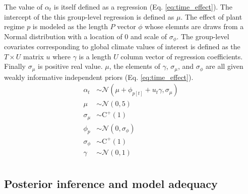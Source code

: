 \documentclass[12pt,letterpaper]{article}
\begin{document}
The value of \(\alpha_{t}\) is itself defined as a regression (Eq. \ref{eq:time_effect}). The intercept of the this group-level regression is defined as \(\mu\). The effect of plant regime \(p\) is modeled as the length \(P\) vector \(\phi\) whose elemnts are draws from a Normal distribution with a location of 0 and scale of \(\sigma_{\phi}\). The group-level covariates corresponding to global climate values of interest is defined as the \(T \times U\) matrix \(u\) where \(\gamma\) is a length \(U\) column vector of regression coefficients. Finally \(\sigma_{\mu}\) is positive real value. \(\mu\), the elements of \(\gamma\), \(\sigma_{\mu}\), and \(\sigma_{\phi}\) are all given weakly informative independent priors (Eq. \ref{eq:time_effect}).
\begin{equation}
  \begin{aligned}
    \alpha_{t} &\sim \mathcal{N}(\mu + \phi_{p[t]} + u_{t} \gamma, \sigma_{\mu}) \\
    \mu &\sim \mathcal{N}(0, 5) \\
    \sigma_{\mu} &\sim \text{C}^{+}(1) \\
    \phi_{p} &\sim \mathcal{N}(0, \sigma_{\phi}) \\
    \sigma_{\phi} &\sim \text{C}^{+}(1) \\
    \gamma &\sim \mathcal{N}(0, 1) \\
  \end{aligned}
  \label{eq:time_effect}
\end{equation}


\subsection*{Posterior inference and model adequacy}
\end{document}
